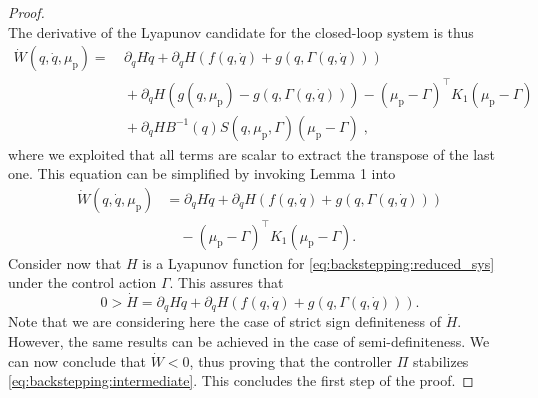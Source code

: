 \begin{proof}
\begin{equation*}
	\end{equation*}
	The derivative of the Lyapunov candidate for the closed-loop system is thus
	\begin{equation*}
	\begin{split}
	\dot{W}(q,\dot{q},\mu_\mathrm{p}) =& \: \partial_{q} H \dot{q} + \partial_{\dot{q}} H (f(q,\dot{q}) + g(q,\Gamma(q,\dot{q}))) \\
	&\: + \partial_{\dot{q}} H (g(q,\mu_\mathrm{p}) - g(q,\Gamma(q,\dot{q}))) - (\mu_\mathrm{p} - \Gamma)^{\top}K_1(\mu_\mathrm{p} - \Gamma) \\
	&\: +  \partial_{\dot{q}} H B^{-1}(q) S(q,\mu_\mathrm{p},\Gamma) (\mu_\mathrm{p} - \Gamma)\;,
	\end{split}
	\end{equation*}
	where we exploited that all terms are scalar to extract the transpose of the last one. This equation can be  simplified by invoking Lemma 1 into
	\begin{equation}
	\begin{split}
	\dot{W}(q,\dot{q},\mu_\mathrm{p}) &=  \partial_{q} H \dot{q} + \partial_{\dot{q}} H (f(q,\dot{q}) + g(q,\Gamma(q,\dot{q}))) \\
	&\quad - (\mu_\mathrm{p} - \Gamma)^{\top}K_1(\mu_\mathrm{p} - \Gamma).
	\end{split}
	\end{equation}
	Consider now that $H$ is a Lyapunov function for \eqref{eq:backstepping:reduced_sys} under the control action $\Gamma$. This assures that
	\begin{equation}
		0 > \dot{H} = \partial_{q} H \dot{q} + \partial_{\dot{q}} H (f(q,\dot{q}) + g(q,\Gamma(q,\dot{q}))).
	\end{equation}
	Note that we are considering here the case of strict sign definiteness of $\dot{H}$. However, the same results can be achieved in the case of semi\--definiteness.
	We can now conclude that $\dot{W} < 0$, thus proving that the controller $\Pi$ stabilizes \eqref{eq:backstepping:intermediate}. This concludes the first step of the proof.
	

\end{proof}
